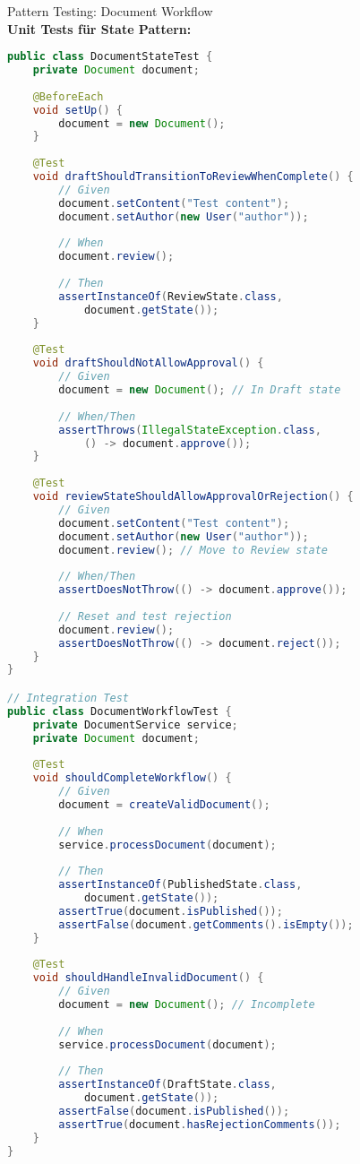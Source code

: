\begin{example2}[breakable]{Pattern Testing: Document Workflow}\\
\textbf{Unit Tests für State Pattern:}

\begin{lstlisting}[language=Java, style=basesmol]
public class DocumentStateTest {
    private Document document;
    
    @BeforeEach
    void setUp() {
        document = new Document();
    }
    
    @Test
    void draftShouldTransitionToReviewWhenComplete() {
        // Given
        document.setContent("Test content");
        document.setAuthor(new User("author"));
        
        // When
        document.review();
        
        // Then
        assertInstanceOf(ReviewState.class, 
            document.getState());
    }
    
    @Test
    void draftShouldNotAllowApproval() {
        // Given
        document = new Document(); // In Draft state
        
        // When/Then
        assertThrows(IllegalStateException.class, 
            () -> document.approve());
    }
    
    @Test
    void reviewStateShouldAllowApprovalOrRejection() {
        // Given
        document.setContent("Test content");
        document.setAuthor(new User("author"));
        document.review(); // Move to Review state
        
        // When/Then
        assertDoesNotThrow(() -> document.approve());
        
        // Reset and test rejection
        document.review();
        assertDoesNotThrow(() -> document.reject());
    }
}

// Integration Test
public class DocumentWorkflowTest {
    private DocumentService service;
    private Document document;
    
    @Test
    void shouldCompleteWorkflow() {
        // Given
        document = createValidDocument();
        
        // When
        service.processDocument(document);
        
        // Then
        assertInstanceOf(PublishedState.class, 
            document.getState());
        assertTrue(document.isPublished());
        assertFalse(document.getComments().isEmpty());
    }
    
    @Test
    void shouldHandleInvalidDocument() {
        // Given
        document = new Document(); // Incomplete
        
        // When
        service.processDocument(document);
        
        // Then
        assertInstanceOf(DraftState.class, 
            document.getState());
        assertFalse(document.isPublished());
        assertTrue(document.hasRejectionComments());
    }
}
\end{lstlisting}
\end{example2}

